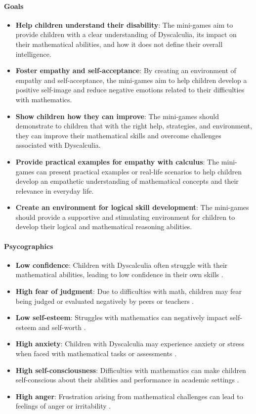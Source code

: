 \paragraph{Goals}
\begin{itemize}
    \item \textbf{Help children understand their disability}: The mini-games aim to provide children with a clear understanding of Dyscalculia, its impact on their mathematical abilities, and how it does not define their overall intelligence.
    \item \textbf{Foster empathy and self-acceptance}: By creating an environment of empathy and self-acceptance, the mini-games aim to help children develop a positive self-image and reduce negative emotions related to their difficulties with mathematics.
    \item \textbf{Show children how they can improve}: The mini-games should demonstrate to children that with the right help, strategies, and environment, they can improve their mathematical skills and overcome challenges associated with Dyscalculia.
    \item \textbf{Provide practical examples for empathy with calculus}: The mini-games can present practical examples or real-life scenarios to help children develop an empathetic understanding of mathematical concepts and their relevance in everyday life.
    \item \textbf{Create an environment for logical skill development}: The mini-games should provide a supportive and stimulating environment for children to develop their logical and mathematical reasoning abilities.
\end{itemize}

\paragraph{Psycographics}
\begin{itemize}
    \item \textbf{Low confidence}: Children with Dyscalculia often struggle with their mathematical abilities, leading to low confidence in their own skills \cite{understood2024}.
    \item \textbf{High fear of judgment}: Due to difficulties with math, children may fear being judged or evaluated negatively by peers or teachers \cite{understood2024}.
    \item \textbf{Low self-esteem}: Struggles with mathematics can negatively impact self-esteem and self-worth \cite{clevelandclinic2024}.
    \item \textbf{High anxiety}: Children with Dyscalculia may experience anxiety or stress when faced with mathematical tasks or assessments \cite{pmc2024}.
    \item \textbf{High self-consciousness}: Difficulties with mathematics can make children self-conscious about their abilities and performance in academic settings \cite{understood2024}.
    \item \textbf{High anger}: Frustration arising from mathematical challenges can lead to feelings of anger or irritability \cite{clevelandclinic2024}.
\end{itemize}

